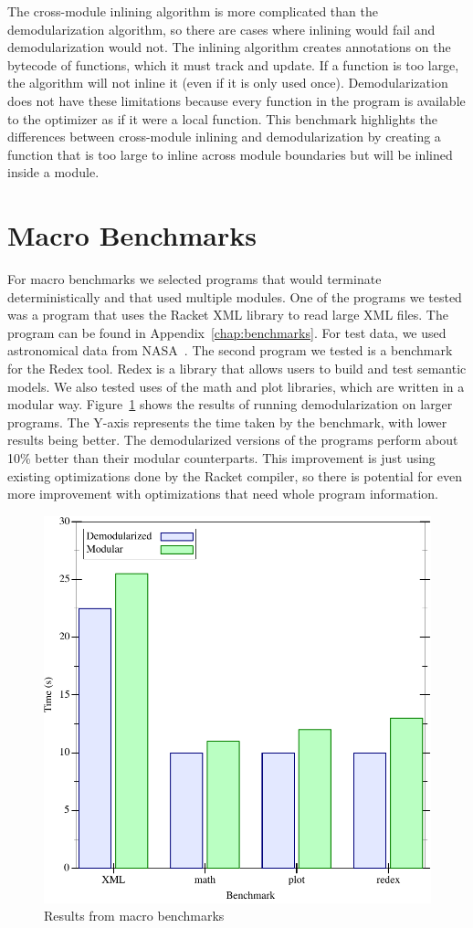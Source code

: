 The cross-module inlining algorithm is more complicated than the demodularization algorithm, so there are cases where inlining would fail and demodularization would not. 
The inlining algorithm creates annotations on the bytecode of functions, which it must track and update.
If a function is too large, the algorithm will not inline it (even if it is only used once). 
Demodularization does not have these limitations because every function in the program is available to the optimizer as if it were a local function. 
This benchmark highlights the differences between cross-module inlining and demodularization by creating a function that is too large to inline across module boundaries but will be inlined inside a module.

\section{Macro Benchmarks}
For macro benchmarks we selected programs that would terminate deterministically and that used multiple modules.
One of the programs we tested was a program that uses the Racket XML library to read large XML files.
The program can be found in Appendix~\ref{chap:benchmarks}.
For test data, we used astronomical data from NASA~\cite{nasa}. 
The second program we tested is a benchmark for the Redex tool.
Redex is a library that allows users to build and test semantic models.
We also tested uses of the math and plot libraries, which are written in a modular way. 
Figure~\ref{fig:macro-results} shows the results of running demodularization on larger programs.
The Y-axis represents the time taken by the benchmark, with lower results being better.
The demodularized versions of the programs perform about 10\% better than their modular counterparts.
This improvement is just using existing optimizations done by the Racket compiler, so there is potential for even more improvement with optimizations that need whole program information.
\begin{figure}
\includegraphics[width=.8\textwidth]{figures/macro-results}
\caption{Results from macro benchmarks}
\label{fig:macro-results}
\end{figure}

